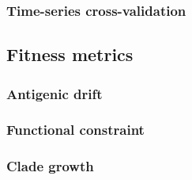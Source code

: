\subsubsection*{Time-series cross-validation}

\subsection*{Fitness metrics}

\subsubsection*{Antigenic drift}

\subsubsection*{Functional constraint}

\subsubsection*{Clade growth}
